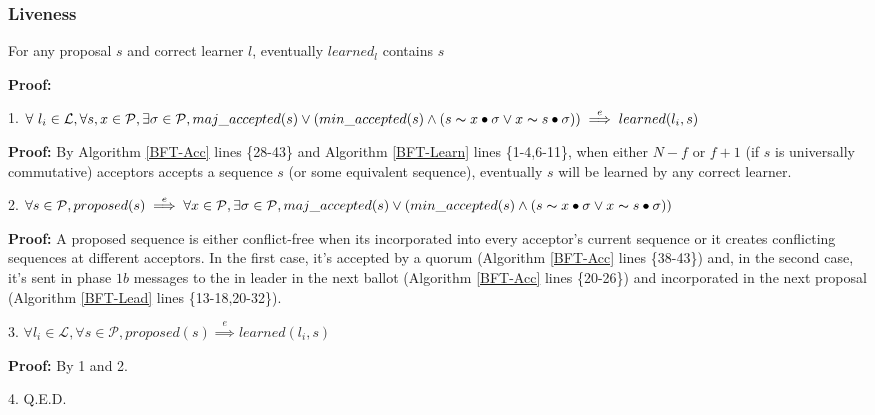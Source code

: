 \subsubsection{Liveness}
\begin{theorem}
For any proposal $s$ and correct learner $l$, eventually $learned_l$ contains $s$ \label{L-T1} \par
\end{theorem} 
\parbox{\linewidth}{\textbf{Proof:}} \par
\parbox{\linewidth}{\strut1. $\forall\ l_i \in \mathcal{L},\forall s,x \in \mathcal{P}, \exists \sigma \in \mathcal{P}, maj\_accepted(s) \lor (min\_accepted(s) \land  (s \thicksim x \bullet \sigma \lor x \thicksim s \bullet \sigma))\overset{e}{\implies} learned(l_i,s)$}\par
\indent\indent\parbox{\linewidth}{\strut\textbf{Proof:} By Algorithm \ref{BFT-Acc} lines \{28-43\} and Algorithm \ref{BFT-Learn} lines \{1-4,6-11\}, when either $N-f$ or $f+1$ (if $s$ is universally commutative) acceptors accepts a sequence $s$ (or some equivalent sequence), eventually $s$ will be learned by any correct learner.}\par
\parbox{\linewidth}{\strut2. $\forall s \in \mathcal{P}, proposed(s) \overset{e}{\implies} \forall x \in \mathcal{P}, \exists \sigma \in \mathcal{P}, maj\_accepted(s) \lor (min\_accepted(s) \land  (s \thicksim x \bullet \sigma \lor x \thicksim s \bullet \sigma))$} \par
\indent\indent\parbox{\linewidth}{\strut\textbf{Proof:} A proposed sequence is either conflict-free when its incorporated into every acceptor's current sequence or it creates conflicting sequences at different acceptors. In the first case, it's accepted by a quorum (Algorithm \ref{BFT-Acc} lines \{38-43\}) and, in the second case, it's sent in phase $1b$ messages to the in leader in the next ballot (Algorithm \ref{BFT-Acc} lines \{20-26\}) and incorporated in the next proposal (Algorithm \ref{BFT-Lead} lines \{13-18,20-32\}).} \par
\parbox{\linewidth}{\strut3. $\forall l_i \in \mathcal{L}, \forall s \in \mathcal{P}, proposed(s) \overset{e}{\implies} learned(l_i,s)$} \par
\indent\indent\parbox{\linewidth}{\strut\textbf{Proof:} By 1 and 2.} \par
\parbox{\linewidth}{\strut4. Q.E.D.}